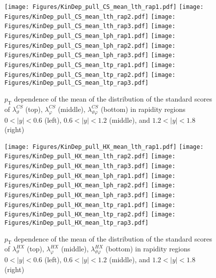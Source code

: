 \documentclass[12pt]{article}
\newcommand{\pT}{p_\mathrm{T}}
\newcommand{\absy}{\left |  y \right |}
\newcommand{\lamthCS}{\lambda^{\scriptscriptstyle CS}_\vartheta}
\newcommand{\lamphCS}{\lambda^{\scriptscriptstyle CS}_\varphi}
\newcommand{\lamthphCS}{\lambda^{\scriptscriptstyle CS}_{\vartheta \varphi}}
\newcommand{\lamthHX}{\lambda^{\scriptscriptstyle HX}_\vartheta}
\newcommand{\lamphHX}{\lambda^{\scriptscriptstyle HX}_\varphi}
\newcommand{\lamthphHX}{\lambda^{\scriptscriptstyle HX}_{\vartheta \varphi}}
\begin{document}


\begin{figure}[htbp]
\centering
\texttt{[image: Figures/KinDep\_pull\_CS\_mean\_lth\_rap1.pdf]}
\texttt{[image: Figures/KinDep\_pull\_CS\_mean\_lth\_rap2.pdf]}
\texttt{[image: Figures/KinDep\_pull\_CS\_mean\_lth\_rap3.pdf]}
\texttt{[image: Figures/KinDep\_pull\_CS\_mean\_lph\_rap1.pdf]}
\texttt{[image: Figures/KinDep\_pull\_CS\_mean\_lph\_rap2.pdf]}
\texttt{[image: Figures/KinDep\_pull\_CS\_mean\_lph\_rap3.pdf]}
\texttt{[image: Figures/KinDep\_pull\_CS\_mean\_ltp\_rap1.pdf]}
\texttt{[image: Figures/KinDep\_pull\_CS\_mean\_ltp\_rap2.pdf]}
\texttt{[image: Figures/KinDep\_pull\_CS\_mean\_ltp\_rap3.pdf]}
\caption{$\pT$ dependence of the mean of the distribution of the standard scores
of $\lamthCS$ (top), $\lamphCS$ (middle), $\lamthphCS$ (bottom) in rapidity
regions $0<\absy<0.6$ (left), $0.6<\absy<1.2$ (middle), and $1.2<\absy<1.8$ (right)}
\end{figure}
\clearpage

\begin{figure}[htbp]
\centering
\texttt{[image: Figures/KinDep\_pull\_HX\_mean\_lth\_rap1.pdf]}
\texttt{[image: Figures/KinDep\_pull\_HX\_mean\_lth\_rap2.pdf]}
\texttt{[image: Figures/KinDep\_pull\_HX\_mean\_lth\_rap3.pdf]}
\texttt{[image: Figures/KinDep\_pull\_HX\_mean\_lph\_rap1.pdf]}
\texttt{[image: Figures/KinDep\_pull\_HX\_mean\_lph\_rap2.pdf]}
\texttt{[image: Figures/KinDep\_pull\_HX\_mean\_lph\_rap3.pdf]}
\texttt{[image: Figures/KinDep\_pull\_HX\_mean\_ltp\_rap1.pdf]}
\texttt{[image: Figures/KinDep\_pull\_HX\_mean\_ltp\_rap2.pdf]}
\texttt{[image: Figures/KinDep\_pull\_HX\_mean\_ltp\_rap3.pdf]}
\caption{$\pT$ dependence of the mean of the distribution of the standard scores
of $\lamthHX$ (top), $\lamphHX$ (middle), $\lamthphHX$ (bottom) in rapidity
regions $0<\absy<0.6$ (left), $0.6<\absy<1.2$ (middle), and $1.2<\absy<1.8$ (right)}
\end{figure}
\clearpage
\end{document}
